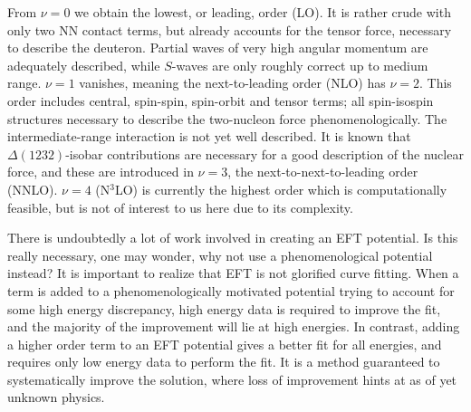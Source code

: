 From \(\nu=0\) we obtain the lowest, or leading, order (LO). It is rather crude
with only two NN contact terms, but already accounts for the tensor force,
necessary to describe the deuteron\cite[p.~18]{Machleidt_2011}. Partial waves of very high angular
momentum are adequately described, while \(S\)-waves are only roughly correct up
to medium range. \(\nu=1\) vanishes, meaning the next-to-leading order (NLO)
has \(\nu=2\). This order includes central, spin-spin, spin-orbit and tensor
terms; all spin-isospin structures necessary to describe the two-nucleon force
phenomenologically. The intermediate-range interaction is not yet well described.
It is known\cite{MACHLEIDT19871,PhysRevC.21.861} that \(\Delta (1232)\)-isobar contributions are necessary for
a good description of the nuclear force, and these are introduced in \(\nu=3\),
the next-to-next-to-leading order (NNLO). \(\nu=4\) (N\(^{3}\)LO) is currently the highest
order which is computationally feasible, but  is not of interest to us here due
to its complexity.

There is undoubtedly a lot of work involved in creating an EFT potential.
Is this really necessary, one may wonder, why not use a phenomenological potential
instead? It is important to realize that EFT is
not glorified curve fitting. When a term is added to a phenomenologically motivated potential
trying to account for some high energy discrepancy, high energy data is required
to improve the fit, and the majority of the improvement will lie at high
energies. In contrast, adding a higher order term to an EFT potential gives a
better fit for all energies, and requires only low energy data to perform the
fit.  It is a method guaranteed to systematically improve the
solution, where loss of improvement hints at as of yet unknown physics. 


